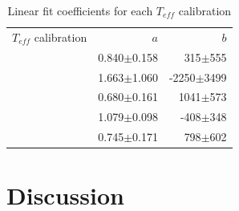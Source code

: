 \documentclass{aa}
\begin{document}
\begin{table}[]
\centering
\caption[]{Linear fit coefficients for each $T_{eff}$ calibration}
\label{table:fit_teff}
\begin{tabular}{l r r}
\hline
\hline
$T_{eff}$ calibration & $a$ & $b$ \\
\citet{Rojas-Ayala-2012}  &  0.840$\pm$0.158 & 315$\pm$555 \\
\citet{Onehag-2012} &  1.663$\pm$1.060 & -2250$\pm$3499 \\
\citet{Mann-2013b}  &  0.680$\pm$0.161 & 1041$\pm$573 \\
\citet{Boyajian-2012} &  1.079$\pm$0.098 & -408$\pm$348 \\
\citet{Rajpurohit-2013a}  &  0.745$\pm$0.171 & 798$\pm$602 \\
\hline
\end{tabular}
\end{table}









\section{Discussion}
\label{sec:discussion}
\end{document}

